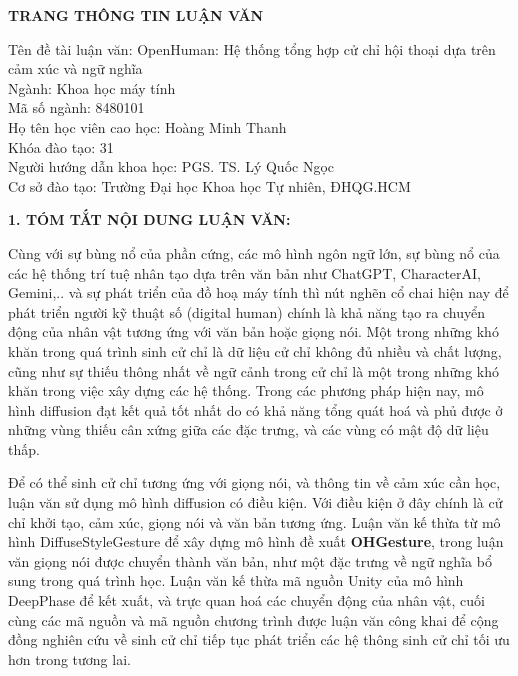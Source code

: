 {}
\begin{center}
{\centering \MakeUppercase \LARGE \fontsize{16.16}{19.26}\selectfont \bfseries TRANG THÔNG TIN LUẬN VĂN}
\end{center}
{
\setlength{\parindent}{0pt}
Tên đề tài luận văn: OpenHuman: Hệ thống tổng hợp cử chỉ hội thoại dựa trên cảm xúc và ngữ nghĩa \\
Ngành: Khoa học máy tính \\
Mã số ngành:  8480101 \\
Họ tên học viên cao học: Hoàng Minh Thanh \\
Khóa đào tạo: 31 \\
Người hướng dẫn khoa học: PGS. TS. Lý Quốc Ngọc \\
Cơ sở đào tạo: Trường Đại học Khoa học Tự nhiên, ĐHQG.HCM}

\vspace{10pt}
{\MakeUppercase \Large \bfseries 1. TÓM TẮT NỘI DUNG LUẬN VĂN:}

Cùng với sự bùng nổ của phần cứng, các mô hình ngôn ngữ lớn, sự bùng nổ của các hệ thống trí tuệ nhân tạo dựa trên văn bản như ChatGPT, CharacterAI, Gemini,..  và sự phát triển của đồ hoạ máy tính thì nút nghẽn cổ chai hiện nay để phát triển người kỹ thuật số (digital human) chính là khả năng tạo ra chuyển động của nhân vật tương ứng với văn bản hoặc giọng nói.
Một trong những khó khăn trong quá trình sinh cử chỉ là dữ liệu cử chỉ không đủ nhiều và chất lượng, cũng như sự thiếu thông nhất về ngữ cảnh trong cử chỉ là một trong những khó khăn trong việc xây dựng các hệ thống. Trong các phương pháp hiện nay,  mô hình diffusion đạt kết quả tốt nhất do có khả năng tổng quát hoá và phủ được ở những vùng thiếu cân xứng giữa các đặc trưng, và các vùng có mật độ dữ liệu thấp.

 Để có thể sinh cử chỉ tương ứng với giọng nói, và thông tin về cảm xúc cần học, luận văn sử dụng mô hình diffusion có điều kiện. Với điều kiện ở đây chính là cử chỉ khởi tạo, cảm xúc, giọng nói và văn bản tương ứng.
Luận văn kế thừa từ mô hình DiffuseStyleGesture để xây dựng mô hình đề xuất \textbf{OHGesture}, trong luận văn giọng nói được chuyển thành văn bản, như một đặc trưng về ngữ nghĩa bổ sung trong quá trình học. Luận văn kế thừa mã nguồn Unity của mô hình DeepPhase để kết xuất, và trực quan hoá các chuyển động của nhân vật, cuối cùng các mã nguồn và mã nguồn chương trình được luận văn công khai để cộng đồng nghiên cứu về sinh cử chỉ tiếp tục phát triển các hệ thông sinh cử chỉ tối ưu hơn trong tương lai. 

